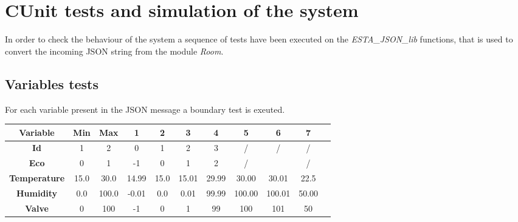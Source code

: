 \newpage
\section{CUnit tests and simulation of the system}
In order to check the behaviour of the system a sequence of tests have been executed on the \textit{ESTA\_JSON\_lib} functions, that is used to convert the incoming JSON string from the module \textit{Room}.

\subsection{Variables tests}
For each variable present in the JSON message a boundary test is exeuted.
\newline
\begin{center}
	\begin{tabular}{|| c | c | c | c | c | c | c | c | c | c | c||} 
		\hline
		Variable				& 	Min 	& Max 	& 1\degree	& 2\degree & 3\degree	& 4\degree & 5\degree	& 6\degree & 7\degree\\ 
		\hline
		\textbf{Id}			&	1 		& 2		& 0 	& 1 & 2 & 3 & / & / & /\\ 
		\hline
		\textbf{Eco}			&	0 		& 1		& -1  & 0 & 1 & 2 & / & & /\\ 
		\hline
		\textbf{Temperature}	&	15.0 	& 30.0	& 14.99 & 15.0 & 15.01 & 29.99& 30.00 & 30.01 &22.5\\ 
		\hline
		\textbf{Humidity}		&	0.0		& 100.0	& -0.01	& 0.0 & 0.01 & 99.99 & 100.00 & 100.01 & 50.00\\ 
		\hline
		\textbf{Valve}			&	0		& 100 	& -1 	& 0 & 1 & 99 & 100 & 101 & 50\\ 
		\hline
	\end{tabular}
\end{center}


